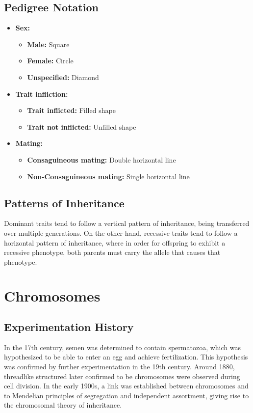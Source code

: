 \documentclass[12pt,titlepage]{article}
\begin{document}
      \subsection{Pedigree Notation}
        \begin{itemize}
          \item \textbf{Sex:}
          \begin{itemize}
            \item \textbf{Male:} Square
            \item \textbf{Female:} Circle
            \item \textbf{Unspecified:} Diamond
          \end{itemize}

          \item \textbf{Trait infliction:}
            \begin{itemize}
              \item \textbf{Trait inflicted:} Filled shape
              \item \textbf{Trait not inflicted:} Unfilled shape
            \end{itemize}

          \item \textbf{Mating:}
            \begin{itemize}
              \item \textbf{Consaguineous mating:} Double horizontal line
              \item \textbf{Non-Consaguineous mating:} Single horizontal line
            \end{itemize}
        \end{itemize}

      \subsection{Patterns of Inheritance}
        Dominant traits tend to follow a vertical pattern of inheritance, being transferred over multiple generations. On the other hand,
        recessive traits tend to follow a horizontal pattern of inheritance, where in order for offspring to exhibit a recessive phenotype,
        both parents must carry the allele that causes that phenotype.

    \section{Chromosomes}
      \subsection{Experimentation History}
        In the 17th century, semen was determined to contain spermatozoa, which was hypothesized to be able to enter an egg and achieve fertilization.
        This hypothesis was confirmed by further experimentation in the 19th century. Around 1880, threadlike structured later confirmed to be
        chromosomes were observed during cell division. In the early 1900s, a link was established between chromosomes and to Mendelian principles of
        segregation and independent assortment, giving rise to the chromosomal theory of inheritance.
\end{document}
